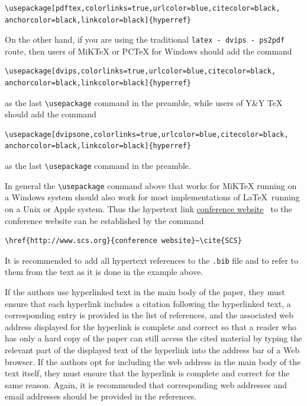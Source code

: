 \documentclass{scspaperproc}
\theoremstyle{scsthe}
\begin{document}
\begin{verbatim}
\usepackage[pdftex,colorlinks=true,urlcolor=blue,citecolor=black,
anchorcolor=black,linkcolor=black]{hyperref}
\end{verbatim}

On the other hand, if you are using the traditional \texttt{latex - dvips - ps2pdf} route, then users of MiKTeX or PCTeX for Windows should add the command

\begin{verbatim}
\usepackage[dvips,colorlinks=true,urlcolor=blue,citecolor=black,
anchorcolor=black,linkcolor=black]{hyperref}
\end{verbatim}

as the last \verb+\usepackage+ command in the preamble, while users of Y\&Y TeX should add the command

\begin{verbatim}
\usepackage[dvipsone,colorlinks=true,urlcolor=blue,citecolor=black,
anchorcolor=black,linkcolor=black]{hyperref}
\end{verbatim}

as the last \verb+\usepackage+ command in the preamble.

In general the \verb+\usepackage+ command above that works for MiKTeX running on a Windows system should also work for most implementations of \LaTeX\ running on a Unix or Apple system.
Thus the hypertext link \href{http://www.scs.org}{conference website}~\cite{SCS} to the conference website can be established by the command

\begin{verbatim}
\href{http://www.scs.org}{conference website}~\cite{SCS}
\end{verbatim}

It is recommended to add all hypertext references to the \texttt{.bib} file and to refer to them from the text as it is done in the example above.

If the authors use hyperlinked text in the main body of the paper, they must ensure that each hyperlink includes a citation following the hyperlinked text, a corresponding entry is provided in the list of references, and the associated web address displayed for the hyperlink is complete and correct so that a reader who has only a hard copy of the paper can still access the cited material by typing the relevant part of the displayed text of the hyperlink into the address bar of a Web browser. If the authors opt for including the web address in the main body of the text itself, they must ensure that the hyperlink is complete and correct for the same reason. Again, it is recommended that corresponding web addresses and email addresses should be provided in the references.
\end{document}
